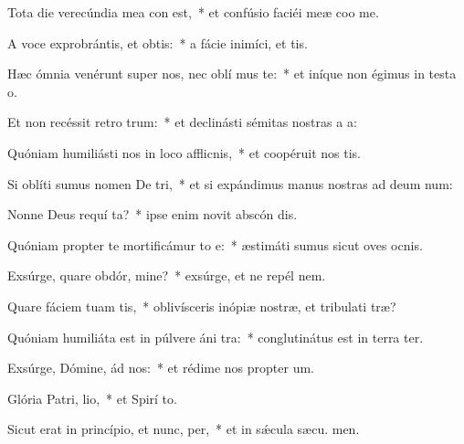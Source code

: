 \item Tota die verecúndia mea con  est,~* et confúsio faciéi meæ coo me.
\item A voce exprobrántis, et obtis:~* a fácie inimíci, et tis.
\item Hæc ómnia venérunt super nos, nec oblí mus te:~* et iníque non égimus in testa o.
\item Et non recéssit retro  trum:~* et declinásti sémitas nostras a  a:
\item Quóniam humiliásti nos in loco afflicnis,~* et coopéruit nos  tis.
\item Si oblíti sumus nomen De tri,~* et si expándimus manus nostras ad deum num:
\item Nonne Deus requí ta?~* ipse enim novit abscón dis.
\item Quóniam propter te mortificámur to e:~* æstimáti sumus sicut oves ocnis.
\item Exsúrge, quare obdór, mine?~* exsúrge, et ne repél  nem.
\item Quare fáciem tuam tis,~* oblivísceris inópiæ nostræ, et tribulati træ?
\item Quóniam humiliáta est in púlvere áni tra:~* conglutinátus est in terra  ter.
\item Exsúrge, Dómine, ád nos:~* et rédime nos propter  um.
\item Glória Patri,  lio,~* et Spirí to.
\item Sicut erat in princípio, et nunc,  per,~* et in sǽcula sæcu. men.
